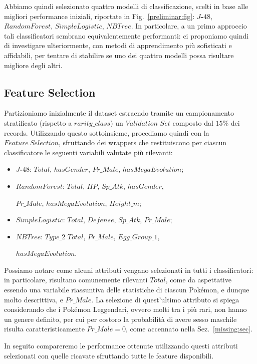 \documentclass[fleqn,10pt]{SelfArx} %
\begin{document}
Abbiamo quindi selezionato quattro modelli di classificazione, scelti in base alle migliori performance iniziali, riportate in Fig.~\ref{preliminar:fig}: \textbf{$J$-$48$}, \textbf{$RandomForest$}, \textbf{$SimpleLogistic$}, \textbf{$NBTree$}. In particolare, a un primo approccio tali classificatori sembrano equivalentemente performanti: ci proponiamo quindi di investigare ulteriormente, con metodi di apprendimento più sofisticati e affidabili, per tentare  di stabilire se uno dei quattro modelli possa risultare migliore degli altri.

\newpage
\subsection{Feature Selection}
Partizioniamo inizialmente il dataset estraendo tramite un campionamento stratificato (rispetto a $rarity\_class$) un $Validation$ $Set$ composto dal $15\%$ dei records.
Utilizzando questo sottoinsieme, procediamo quindi con la $Feature\ Selection$, sfruttando dei wrappers che restituiscono per ciascun classificatore le seguenti variabili valutate più rilevanti:
\begin{itemize}
\item \textbf{$J$-$48$}: $Total$, $hasGender$, $Pr\_Male$, $hasMegaEvolution$;
\item \textbf{$RandomForest$}: $Total$, $HP$, $Sp\_Atk$, $hasGender$, 

$Pr\_Male$, $hasMegaEvolution$, $Height\_m$;
\item \textbf{$SimpleLogistic$}: $Total$, $Defense$, $Sp\_Atk$, $Pr\_Male$;
\item \textbf{$NBTree$}: $Type\_2$ $Total$, $Pr\_Male$, $Egg\_Group\_1$,
 
 $hasMegaEvolution$.
\end{itemize}

Possiamo notare come alcuni attributi vengano selezionati in tutti i classificatori: in particolare, risultano comunemente rilevanti $Total$, come da aspettative essendo una variabile riassuntiva delle statistiche di ciascun Pokémon, e dunque molto descrittiva, e $Pr\_Male$. La selezione di quest'ultimo attributo si spiega considerando che i Pokémon Leggendari, ovvero molti tra i più rari, non hanno un genere definito, per cui per costoro la probabilità di avere sesso maschile risulta caratteristicamente $Pr\_Male=0$, come accennato nella Sez.~\ref{missing:sec}. 

In seguito compareremo le performance ottenute utilizzando questi attributi selezionati con quelle ricavate sfruttando tutte le feature disponibili.
\end{document}
